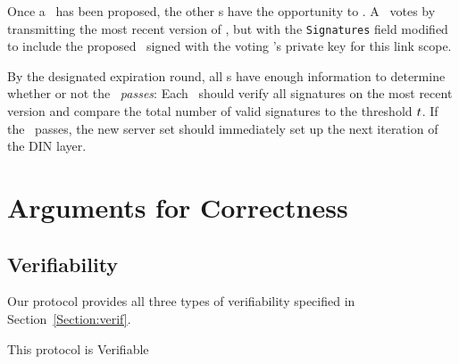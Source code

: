 Once a \KwPetition~has been proposed, the other \KwMember s have the
opportunity to \NameVote. A \KwMember~votes by transmitting the most
recent version of \SetVotes, but with the \texttt{Signatures} field
modified to include the proposed \KwManifest~signed with the voting
\KwMember's private key for this link scope.

By the designated expiration round, all \KwMember s have enough
information to determine whether or not the \KwPetition~\emph{passes}:
Each \KwMember~should verify all signatures on the most recent
version
and compare the total number of valid signatures to the threshold $t$. If the
\KwPetition~passes, the new server set should immediately set up the
next iteration of the DIN layer.

\section{Arguments for Correctness}
\subsection{Verifiability}
Our protocol provides all three types of verifiability specified in
Section~\ref{Section:verif}.

\begin{theorem} This protocol is Verifiable\end{theorem}

